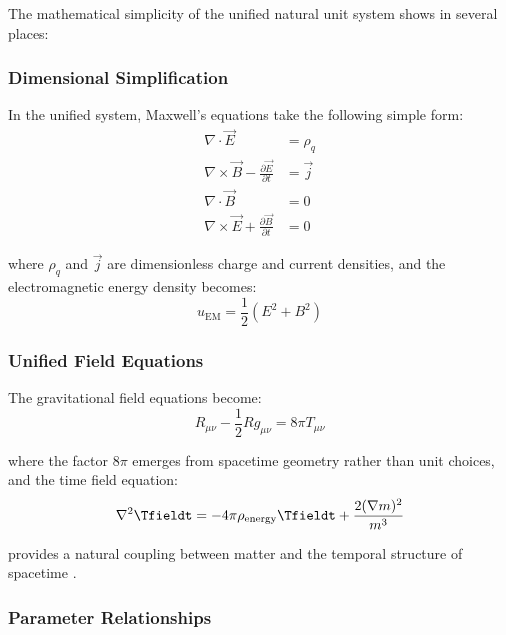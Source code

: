 	The mathematical simplicity of the unified natural unit system shows in several places:
	
	\subsubsection{Dimensional Simplification}
	\label{subsubsec:dimensional_simplification}
	
	In the unified system, Maxwell's equations take the following simple form:
	\begin{align}
		\nabla \cdot \vec{E} &= \rho_q \\
		\nabla \times \vec{B} - \frac{\partial \vec{E}}{\partial t} &= \vec{j} \\
		\nabla \cdot \vec{B} &= 0 \\
		\nabla \times \vec{E} + \frac{\partial \vec{B}}{\partial t} &= 0
	\end{align}
	
	where $\rho_q$ and $\vec{j}$ are dimensionless charge and current densities, and the electromagnetic energy density becomes:
	\begin{equation}
		u_{\text{EM}} = \frac{1}{2}(E^2 + B^2)
	\end{equation}
	
	\subsubsection{Unified Field Equations}
	\label{subsubsec:unified_field_equations}
	
	The gravitational field equations become:
	\begin{equation}
		R_{\mu\nu} - \frac{1}{2}Rg_{\mu\nu} = 8\pi T_{\mu\nu}
	\end{equation}
	
	where the factor $8\pi$ emerges from spacetime geometry rather than unit choices, and the time field equation:
	\begin{equation}
		\nabla^2 \Tfieldt = -4\pi\rho_{\text{energy}} \Tfieldt + \frac{2(\nabla m)^2}{m^3}
	\end{equation}
	
	provides a natural coupling between matter and the temporal structure of spacetime \cite{pascher_lagrangian_2025}.
	
	\subsubsection{Parameter Relationships}
	\label{subsubsec:parameter_relationships}
	
